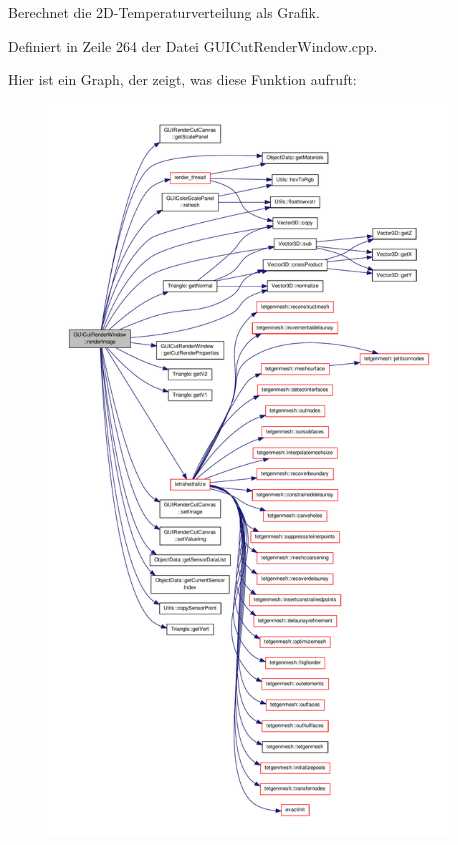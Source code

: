 Berechnet die 2\-D-\/\-Temperaturverteilung als Grafik. 



Definiert in Zeile 264 der Datei G\-U\-I\-Cut\-Render\-Window.\-cpp.



Hier ist ein Graph, der zeigt, was diese Funktion aufruft\-:
\nopagebreak
\begin{figure}[H]
\begin{center}
\leavevmode
\includegraphics[height=550pt]{classGUICutRenderWindow_a9eedb7088ad31f4680a77ed3a06fa60c_cgraph}
\end{center}
\end{figure}





